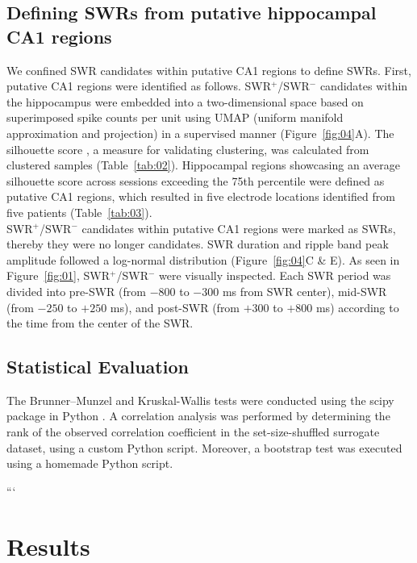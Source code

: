 \documentclass[final,3p,times,twocolumn]{elsarticle}
\begin{document}
\subsection{Defining SWRs from putative hippocampal CA1 regions}
We confined SWR candidates within putative CA1 regions to define SWRs. First, putative CA1 regions were identified as follows. SWR$^+$/SWR$^-$ candidates within the hippocampus were embedded into a two-dimensional space based on superimposed spike counts per unit using UMAP (uniform manifold approximation and projection) \cite{mcinnes_umap_2018} in a supervised manner (Figure~\ref{fig:04}A). The silhouette score \cite{rousseeuw_silhouettes_1987}, a measure for validating clustering, was calculated from clustered samples (Table~\ref{tab:02}). Hippocampal regions showcasing an average silhouette score across sessions exceeding the 75th percentile were defined as putative CA1 regions, which resulted in five electrode locations identified from five patients (Table~\ref{tab:03}).
\\
\indent
SWR$^+$/SWR$^-$ candidates within putative CA1 regions were marked as SWRs, thereby they were no longer candidates. SWR duration and ripple band peak amplitude followed a log-normal distribution (Figure~\ref{fig:04}C \& E). As seen in Figure~\ref{fig:01}, SWR$^+$/SWR$^-$ were visually inspected. Each SWR period was divided into pre-SWR (from $-800$ to $-300$ ms from SWR center), mid-SWR (from $-250$ to $+250$ ms), and post-SWR (from $+300$ to $+800$ ms) according to the time from the center of the SWR.

\subsection{Statistical Evaluation}
The Brunner--Munzel and Kruskal-Wallis tests were conducted using the scipy package in Python \cite{virtanen_scipy_2020}. A correlation analysis was performed by determining the rank of the observed correlation coefficient in the set-size-shuffled surrogate dataset, using a custom Python script. Moreover, a bootstrap test was executed using a homemade Python script.

\label{sec:methods}
```\section{Results}
\end{document}

